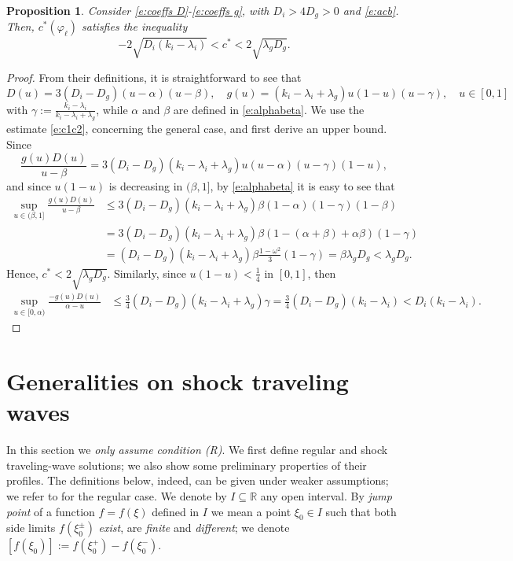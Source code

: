 \documentclass[11pt,a4paper]{article}
\newcommand{\R}{\mathbb R}
\newtheorem{proposition}{Proposition}[section]
\renewcommand{\phi}{\varphi}
\begin{document}
\begin{proposition} \label{p:interval-c}
Consider \eqref{e:coeffs D}-\eqref{e:coeffs g}, with $D_i>4D_g>0$ and \eqref{e:acb}. Then,  $c^*(\phi_{\ell})$ satisfies the inequality
\begin{equation}\label{e:intervallo-c}
-2\sqrt{D_i(k_i-\lambda_i)} < c^*< 2\sqrt{\lambda_gD_g}.
\end{equation}
\end{proposition}
\begin{proof} From their definitions, it is straightforward to see that
\[
D(u)=3(D_i-D_g)(u-\alpha)(u-\beta), \quad g(u)=(k_i-\lambda_i+\lambda_g)u(1-u)(u-\gamma), \quad u\in [0,1]
\]
with $\gamma:=\frac{k_i-\lambda_i}{k_i-\lambda_i+\lambda_g}$, while  $\alpha$ and $\beta$ are defined in \eqref{e:alphabeta}. 
We use the estimate \eqref{e:c1c2}, concerning  the general case, and first derive an upper bound. Since 
\[
\frac{g(u)D(u)}{u-\beta}=3(D_i-D_g)(k_i-\lambda_i+\lambda_g)u(u-\alpha)(u-\gamma)(1-u),
\]
and since $u(1-u)$ is decreasing in $(\beta,1]$, by \eqref{e:alphabeta} it is easy to see that
\begin{align*}
\sup_{u\in (\beta, 1]} \frac{g(u)D(u)}{u-\beta}&\le 3(D_i-D_g)(k_i-\lambda_i+\lambda_g)\beta(1-\alpha)(1-\gamma)(1-\beta)
\\ 
&=3(D_i-D_g)(k_i-\lambda_i+\lambda_g)\beta\left(1-(\alpha+\beta)+\alpha\beta\right)(1-\gamma)
\\
&=(D_i-D_g)(k_i-\lambda_i+\lambda_g)\beta\frac{1-\omega^2}{3}(1-\gamma)= \beta\lambda_gD_g<\lambda_gD_g.
\end{align*}
Hence, $c^*<2\sqrt{\lambda_gD_g}$.
Similarly, since $u(1-u)<\frac14$ in $[0,1]$, then
\begin{align*}
\sup_{u\in [0, \alpha)} \frac{-g(u)D(u)}{\alpha-u}&\le \frac34(D_i-D_g)(k_i-\lambda_i+\lambda_g) \gamma =\frac34(D_i-D_g)(k_i-\lambda_i)< D_i(k_i-\lambda_i).
\end{align*}
\end{proof}

\section{Generalities on shock traveling waves }\label{e:MR}
\setcounter{equation}{0}
In this section we {\em only assume condition {\rm (R)}}. We first define regular and shock traveling-wave solutions; we also show some preliminary properties of their profiles. The definitions below, indeed, can be given under weaker assumptions; we refer to \cite{GK} for the regular case.  
We denote by $I\subseteq\R$ any open interval. By {\em jump point} of a function $f=f(\xi)$ defined in $I$ we mean a point $\xi_0\in I$ such that both side limits $f(\xi_0^\pm)$ {\em exist}, are {\em finite} and {\em different}; we denote $[f(\xi_0)]:=f(\xi_0^+)-f(\xi_0^-)$. 
\end{document}
